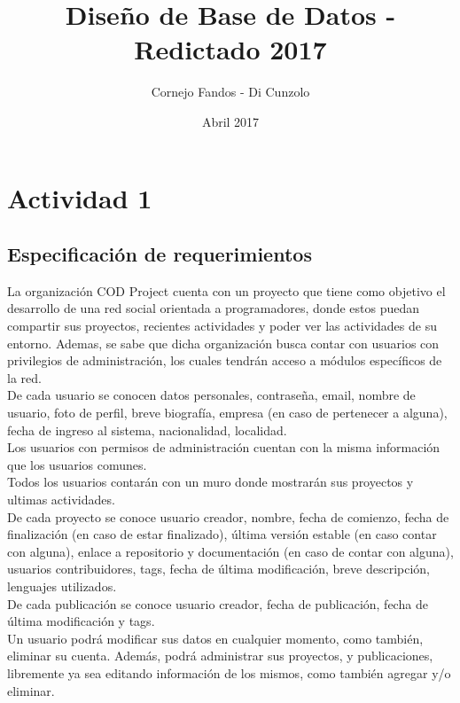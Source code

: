 \documentclass[a4paper,10pt]{article}
\title{Diseño de Base de Datos - Redictado 2017}
\author{Cornejo Fandos - Di Cunzolo}
\date{Abril 2017}
\begin{document}
\maketitle

\section{Actividad 1}
    \subsection{Especificación de requerimientos}
    
    La organización COD Project cuenta con un proyecto que tiene como objetivo el desarrollo de una red social orientada a programadores, donde estos puedan compartir sus proyectos, recientes actividades y poder ver las actividades de su entorno. Ademas, se sabe que dicha organización busca contar con usuarios con privilegios de administración, los cuales tendrán acceso a módulos específicos de la red. \\
    
    De cada usuario se conocen datos personales, contraseña, email, nombre de usuario, foto de perfil, breve biografía, empresa (en caso de pertenecer a alguna), fecha de ingreso al sistema, nacionalidad, localidad. \\
    Los usuarios con permisos de administración cuentan con la misma información que los usuarios comunes. \\
    
    Todos los usuarios contarán con un muro donde mostrarán sus proyectos y ultimas actividades. \\
    De cada proyecto se conoce usuario creador, nombre, fecha de comienzo, fecha de finalización (en caso de estar finalizado), última versión estable (en caso contar con alguna), enlace a repositorio y documentación (en caso de contar con alguna), usuarios contribuidores, tags, fecha de última modificación, breve descripción, lenguajes utilizados. \\
    
    De cada publicación se conoce usuario creador, fecha de publicación, fecha de última modificación y tags. \\
    
    Un usuario podrá modificar sus datos en cualquier momento, como también, eliminar su cuenta. Además, podrá administrar sus proyectos, y publicaciones, libremente ya sea editando información de los mismos, como también agregar y/o eliminar. \\
    
\end{document}
